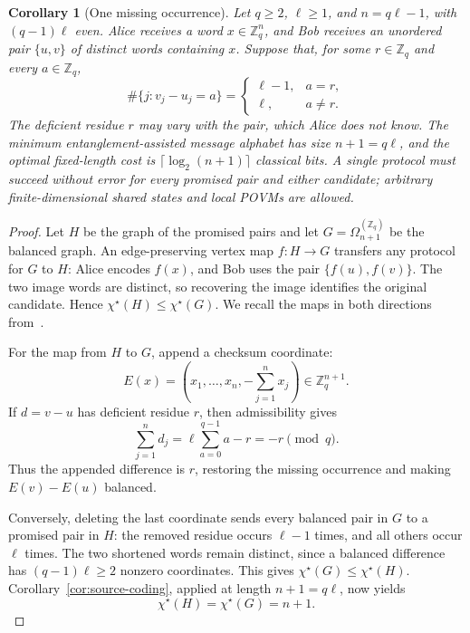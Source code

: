 \documentclass[11pt,a4paper]{article}
\numberwithin{equation}{section}
\numberwithin{figure}{section}
\numberwithin{table}{section}
\numberwithin{footnote}{section}
\newtheorem{corollary}[theorem]{Corollary}
\theoremstyle{informal}\newtheorem*{informaltheorem}{Informal theorem}
\theoremstyle{definition}\newtheorem{example}{Example}[section]
\theoremstyle{remark}\newtheorem{remark}[theorem]{Remark}
\newcommand{\Z}{\mathbb Z}
\newcommand{\chs}{\chi^{\star}}
\begin{document}
\begin{corollary}[One missing occurrence]\label{cor:near-balanced-coding}
Let \(q\geq2\), \(\ell\geq1\), and \(n=q\ell-1\), with
\((q-1)\ell\) even. Alice receives a word \(x\in\Z_q^n\), and
Bob receives an unordered pair \(\{u,v\}\) of distinct words
containing \(x\). Suppose that, for some \(r\in\Z_q\) and
every \(a\in\Z_q\),
\begin{equation}
 \#\{j:v_j-u_j=a\}=\begin{cases}
   \ell-1,&a=r,\\
   \ell,&a\ne r.
 \end{cases}
\end{equation}
The deficient residue \(r\) may vary with the pair, which Alice
does not know. The minimum entanglement-assisted message alphabet
has size \(n+1=q\ell\), and the optimal fixed-length cost is
\(\lceil\log_2(n+1)\rceil\) classical bits. A single protocol must
succeed without error for every promised pair and either candidate;
arbitrary finite-dimensional shared states and local POVMs are allowed.
\end{corollary}
\begin{proof}
Let \(H\) be the graph of the promised pairs and let
\(G=\Omega_{n+1}^{(\Z_q)}\) be the balanced graph. An
edge-preserving vertex map \(f:H\to G\) transfers any protocol
for \(G\) to \(H\): Alice encodes \(f(x)\), and Bob uses the
pair \(\{f(u),f(v)\}\). The two image words are distinct, so recovering
the image identifies the original candidate. Hence
\(\chs(H)\leq\chs(G)\). We recall the maps in both directions
from~\cite[Theorem~6]{lnz}.

For the map from \(H\) to \(G\), append a checksum coordinate:
\begin{equation}
 E(x)=\left(x_1,\ldots,x_n,-\sum_{j=1}^n x_j\right)\in\Z_q^{n+1}.
\end{equation}
If \(d=v-u\) has deficient residue \(r\), then admissibility gives
\begin{equation}
 \sum_{j=1}^n d_j
 =\ell\sum_{a=0}^{q-1}a-r
 =-r\pmod q.
\end{equation}
Thus the appended difference is \(r\), restoring the missing
occurrence and making \(E(v)-E(u)\) balanced.

Conversely, deleting the last coordinate sends every balanced pair
in \(G\) to a promised pair in \(H\): the removed residue occurs
\(\ell-1\) times, and all others occur \(\ell\) times. The two
shortened words remain distinct, since a balanced difference has
\((q-1)\ell\geq2\) nonzero coordinates. This gives
\(\chs(G)\leq\chs(H)\). Corollary~\ref{cor:source-coding},
applied at length \(n+1=q\ell\), now yields
\begin{equation}
 \chs(H)=\chs(G)=n+1.
\end{equation}
\end{proof}
\end{document}
